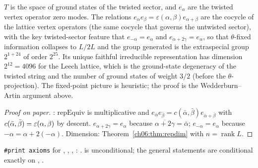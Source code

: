 \begin{physics}
$T$ is the space of ground states of the twisted sector, and $e_\alpha$ are the twisted vertex operator zero modes. The relations $e_\alpha e_\beta=\varepsilon(\alpha,\beta)e_{\alpha+\beta}$ are the cocycle of the lattice vertex operators (the same cocycle that governs the untwisted sector), with the key twisted-sector feature that $e_{-\alpha}=e_\alpha$ and $e_{\alpha+2\gamma}=e_\alpha$, so that $\theta$-fixed information collapses to $L/2L$ and the group generated is the extraspecial group $2^{1+24}$ of order $2^{25}$. Its unique faithful irreducible representation has dimension $2^{12}=4096$ for the Leech lattice, which is the ground-state degeneracy of the twisted string and the number of ground states of weight $3/2$ (before the $\theta$-projection). The fixed-point picture is heuristic; the proof is the Wedderburn--Artin argument above.
\end{physics}
\begin{proof}[Proof on paper]
: $\mathrm{repEquiv}$ is multiplicative and $e_{\bar\alpha}e_{\bar\beta}=
c(\bar\alpha,\bar\beta)e_{\bar\alpha+\bar\beta}$ with $c(\bar\alpha,\bar\beta)=\varepsilon(\alpha,
\beta)$ by descent.  $e_{\alpha+2\gamma}=e_\alpha$ because $\overline{\alpha+2\gamma}=\bar\alpha$;
$e_{-\alpha}=e_\alpha$ because $-\alpha=\alpha+2(-\alpha)$.  Dimension: Theorem~\ref{ch06:thm:repdim}
with $n=\operatorname{rank}L$.
\end{proof}
\begin{status}
\texttt{\#print axioms} for , , ,
: .   is
unconditional; the general statements are conditional exactly on , .
\end{status}

